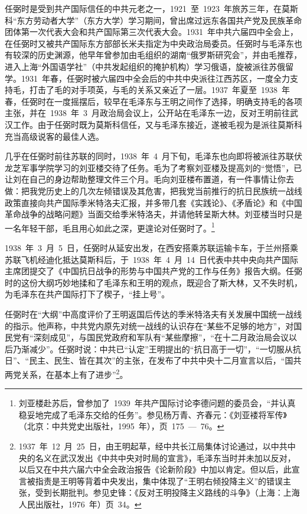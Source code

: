 任弼时是受到共产国际信任的中共元老之一，1921~至~1923~年旅苏三年，在莫斯科“东方劳动者大学”（东方大学）学习期间，曾出席过远东各国共产党及民族革命团体第一次代表大会和共产国际第三次代表大会。1931~年中共六届四中全会上，在任弼时又被共产国际东方部部长米夫指定为中央政治局委员。任弼时与毛泽东也有较深的历史渊源，他早年曾参加由毛组织的湖南“俄罗斯研究会”，并由毛推荐，进入上海“外国语学社”（中共发起组织的掩护机构）学习俄语，旋被派往苏俄留学。1931~年春，任弼时被六届四中全会后的中共中央派往江西苏区，一度全力支持毛，打击了毛的对手项英，与毛的关系又亲近了一层。1937~年夏至~1938~年春，任弼时在一度摇摆后，较早在毛泽东与王明之间作了选择，明确支持毛的各项主张，并在~1938~年~3~月政治局会议上，公开站在毛泽东一边，反对王明前往武汉工作。由于任弼时既为莫斯科信任，又与毛泽东接近，遂被毛视为是派往莫斯科充当高级说客的最佳人选。

几乎在任弼时前往苏联的同时，1938~年~4~月下旬，毛泽东也向即将被派往苏联伏龙芝军事学院学习的刘亚楼交待了任务。毛为了考察刘亚楼及提高刘的“觉悟”，已让刘在自己的身边帮助整理文件三个月。毛向刘亚楼布置道，有一件事情让你去做：把我党历史上的几次左倾错误及其危害，把我党当前推行的抗日民族统一战线政策直接向共产国际季米特洛夫汇报，并多带几套《实践论》、《矛盾论》和《中国革命战争的战略问题》当面交给季米特洛夫，并请他转呈斯大林。刘亚楼当时只是一名年轻干部，毛且用心如此之深，更遑论对任弼时了。\footnote{刘亚楼赴苏后，曾参加了~1939~年共产国际讨论李德问题的委员会，“并认真稳妥地完成了毛泽东交给的任务”。参见杨万青、齐春元：《刘亚褛将军传》（北京：中共党史出版社，1995~年），页~175~—~76。}

1938~年~3~月~5~日，任弼时从延安出发，在西安搭乘苏联运输卡车，于兰州搭乘苏联飞机经迪化抵达莫斯科后，于~1938~年~4~月~14~日代表中共中央向共产国际主席团提交了《中国抗日战争的形势与中国共产党的工作与任务》报告大纲。任弼时的这份大纲巧妙地揉和了毛泽东和王明的观点，既迎合了斯大林，又不失时机，为毛泽东在共产国际打下了楔子，“挂上号”。

任弼时在“大纲”中高度评价了王明返国后传达的季米特洛夫有关发展中国统一战线的指示。他声称，中共党内原先对统一战线的认识存在“某些不足够的地方”，对国民党有“深刻成见”，与国民党政府和军队有“某些摩擦”，“在十二月政治局会议以后乃渐减少”。任弼时说：中共已“认定”王明提出的“抗日高于一切”，“一切服从抗日”、“民主、民生、皆在其次”的主张，在发布了中共中央十二月宣言以后，“国共两党关系，在基本上有了进步”\footnote{1937~年~12~月~25~日，由王明起草，经中共长江局集体讨论通过，以中共中央的名义在武汉发出《中共中央对时局的宣言》，毛泽东当时并未加以反对，以后又在中共六届六中全会政治报告《论新阶段》中加以肯定。但以后，此宣言被指责是王明等背着中央发出，集中体现了“王明右倾投降主义”的错误主张，受到长期批判。参见史锋：《反对王明投降主义路线的斗争》（上海：上海人民出版社，1976~年）页~34。}。


